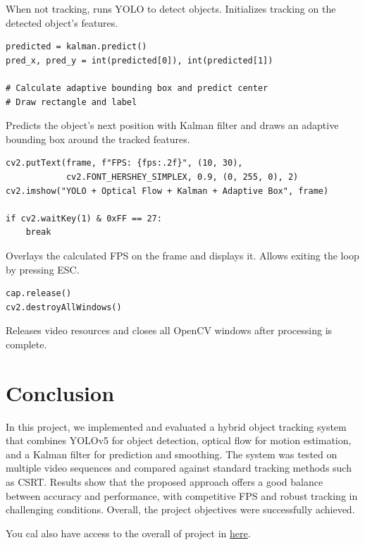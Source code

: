 \documentclass[a4paper,12pt]{article}
\begin{document}
When not tracking, runs YOLO to detect objects. Initializes tracking on the detected object's features.

\vspace{0.5em}
\begin{tcolorbox}[colback=lightgray!20, colframe=gray!80, title=Kalman Prediction and Bounding Box Drawing]
\begin{verbatim}
predicted = kalman.predict()
pred_x, pred_y = int(predicted[0]), int(predicted[1])

# Calculate adaptive bounding box and predict center
# Draw rectangle and label
\end{verbatim}
\end{tcolorbox}

Predicts the object's next position with Kalman filter and draws an adaptive bounding box around the tracked features.

\vspace{0.5em}
\begin{tcolorbox}[colback=lightgray!20, colframe=gray!80, title=Display FPS and Frame]
\begin{verbatim}
cv2.putText(frame, f"FPS: {fps:.2f}", (10, 30), 
            cv2.FONT_HERSHEY_SIMPLEX, 0.9, (0, 255, 0), 2)
cv2.imshow("YOLO + Optical Flow + Kalman + Adaptive Box", frame)

if cv2.waitKey(1) & 0xFF == 27:
    break
\end{verbatim}
\end{tcolorbox}

Overlays the calculated FPS on the frame and displays it. Allows exiting the loop by pressing ESC.

\vspace{0.5em}
\begin{tcolorbox}[colback=lightgray!20, colframe=gray!80, title=Cleanup]
\begin{verbatim}
cap.release()
cv2.destroyAllWindows()
\end{verbatim}
\end{tcolorbox}

Releases video resources and closes all OpenCV windows after processing is complete.

\section{Conclusion}

In this project, we implemented and evaluated a hybrid object tracking system that combines YOLOv5 for object detection, optical flow for motion estimation, and a Kalman filter for prediction and smoothing. The system was tested on multiple video sequences and compared against standard tracking methods such as CSRT. Results show that the proposed approach offers a good balance between accuracy and performance, with competitive FPS and robust tracking in challenging conditions. Overall, the project objectives were successfully achieved.

You cal also have access to the overall of project in \href{https://miro.com/app/board/uXjVJYlgPcI=/}{here}.
\end{document}

